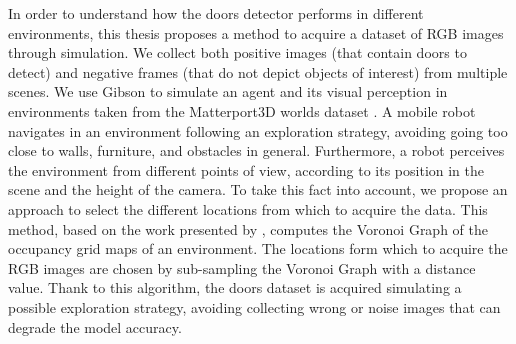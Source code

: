 In order to understand how the doors detector performs in different environments, this thesis proposes a method to acquire a dataset of RGB images through simulation. We collect both positive images (that contain doors to detect) and negative frames (that do not depict objects of interest) from multiple scenes. We use Gibson \cite{gibson} to simulate an agent and its visual perception in environments taken from the Matterport3D worlds dataset \cite{matterport}. A mobile robot navigates in an environment following an exploration strategy, avoiding going too close to walls, furniture, and obstacles in general. Furthermore, a robot perceives the environment from different points of view, according to its position in the scene and the height of the camera. To take this fact into account, we propose an approach to select the different locations from which to acquire the data. This method, based on the work presented by \citeauthor{repeatabilityslamarxiv} \cite{repeatabilityslamarxiv, repeatabilityslam}, computes the Voronoi Graph of the occupancy grid maps of an environment. The locations form which to acquire the RGB images are chosen by sub-sampling the Voronoi Graph with a distance value. Thank to this algorithm, the doors dataset is acquired simulating a possible exploration strategy, avoiding collecting wrong or noise images that can degrade the model accuracy.

